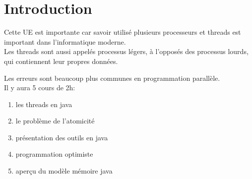\section{Introduction}

Cette UE est importante car savoir utilisé plusieurs processeurs et threads est important dans l'informatique
moderne.\\
Les threads sont aussi appelés processus légers, à l'opposés des processus lourds, qui contiennent leur
propres données.

Les erreurs sont beaucoup plus communes en programmation parallèle.\\

Il y aura 5 cours de 2h:
\begin{enumerate}
	\item les threads en java
	\item le problème de l'atomicité
	\item présentation des outils en java
	\item programmation optimiste
	\item aperçu du modèle mémoire java
\end{enumerate}
